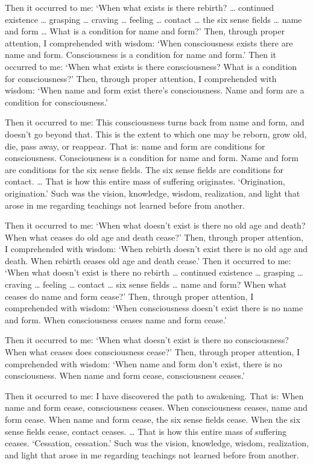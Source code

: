 \documentclass[12pt,openany]{book}%
\begin{document}
Then it occurred to me: ‘When what exists is there rebirth? … continued existence … grasping … craving … feeling … contact … the six sense fields … name and form … What is a condition for name and form?’ Then, through proper attention, I comprehended with wisdom: ‘When consciousness exists there are name and form. Consciousness is a condition for name and form.’ Then it occurred to me: ‘When what exists is there consciousness? What is a condition for consciousness?’ Then, through proper attention, I comprehended with wisdom: ‘When name and form exist there’s consciousness. Name and form are a condition for consciousness.’ 

Then it occurred to me: This consciousness turns back from name and form, and doesn’t go beyond that. This is the extent to which one may be reborn, grow old, die, pass away, or reappear. That is: name and form are conditions for consciousness. Consciousness is a condition for name and form. Name and form are conditions for the six sense fields. The six sense fields are conditions for contact. … That is how this entire mass of suffering originates. ‘Origination, origination.’ Such was the vision, knowledge, wisdom, realization, and light that arose in me regarding teachings not learned before from another. 

Then it occurred to me: ‘When what doesn’t exist is there no old age and death? When what ceases do old age and death cease?’ Then, through proper attention, I comprehended with wisdom: ‘When rebirth doesn’t exist there is no old age and death. When rebirth ceases old age and death cease.’ Then it occurred to me: ‘When what doesn’t exist is there no rebirth … continued existence … grasping … craving … feeling … contact … six sense fields … name and form? When what ceases do name and form cease?’ Then, through proper attention, I comprehended with wisdom: ‘When consciousness doesn’t exist there is no name and form. When consciousness ceases name and form cease.’ 

Then it occurred to me: ‘When what doesn’t exist is there no consciousness? When what ceases does consciousness cease?’ Then, through proper attention, I comprehended with wisdom: ‘When name and form don’t exist, there is no consciousness. When name and form cease, consciousness ceases.’ 

Then it occurred to me: I have discovered the path to awakening. That is: When name and form cease, consciousness ceases. When consciousness ceases, name and form cease. When name and form cease, the six sense fields cease. When the six sense fields cease, contact ceases. … That is how this entire mass of suffering ceases. ‘Cessation, cessation.’ Such was the vision, knowledge, wisdom, realization, and light that arose in me regarding teachings not learned before from another. 
\end{document}
